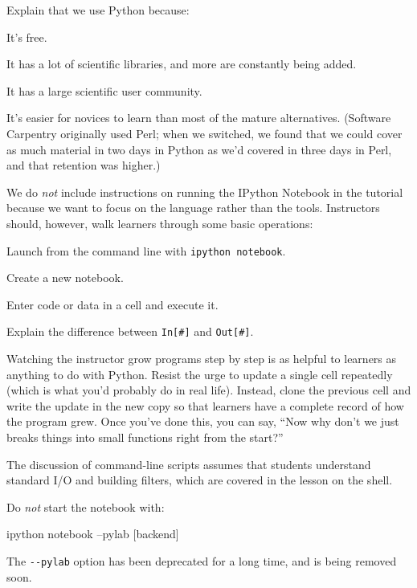 \documentclass{book}
\begin{document}
\begin{swcitemize}
\item
  Explain that we use Python because:

  \begin{swcitemize2}
  \item
    It's free.
  \item
    It has a lot of scientific libraries, and more are constantly being
    added.
  \item
    It has a large scientific user community.
  \item
    It's easier for novices to learn than most of the mature
    alternatives. (Software Carpentry originally used Perl; when we
    switched, we found that we could cover as much material in two days
    in Python as we'd covered in three days in Perl, and that retention
    was higher.)
   \end{swcitemize2}
\item
  We do \emph{not} include instructions on running the IPython Notebook
  in the tutorial because we want to focus on the language rather than
  the tools. Instructors should, however, walk learners through some
  basic operations:

  \begin{swcitemize2}
  \item
    Launch from the command line with \texttt{ipython notebook}.
  \item
    Create a new notebook.
  \item
    Enter code or data in a cell and execute it.
  \item
    Explain the difference between \texttt{In{[}\#{]}} and
    \texttt{Out{[}\#{]}}.
   \end{swcitemize2}
\item
  Watching the instructor grow programs step by step is as helpful to
  learners as anything to do with Python. Resist the urge to update a
  single cell repeatedly (which is what you'd probably do in real life).
  Instead, clone the previous cell and write the update in the new copy
  so that learners have a complete record of how the program grew. Once
  you've done this, you can say, ``Now why don't we just breaks things
  into small functions right from the start?''
\item
  The discussion of command-line scripts assumes that students
  understand standard I/O and building filters, which are covered in the
  lesson on the shell.
\item
  Do \emph{not} start the notebook with:

\begin{VerbIn}
ipython notebook --pylab [backend]
\end{VerbIn}

  The \texttt{-{}-pylab} option has been deprecated for a long time, and
  is being removed soon.
\end{swcitemize}
\end{document}
